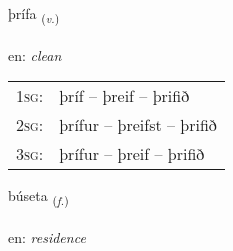 \documentclass[frontgrid, backgrid]{flacards}\usepackage[]{graphicx}\usepackage[]{xcolor}
\begin{document}
\renewcommand{\flhead}{\vskip5pt \fboxsep=0pt {\small\bfseries\footnotesize Sagnorð | Verb}}
\renewcommand{\fcfoot}{\vskip5pt \fboxsep=0pt \hspace{2pt}{\small\bfseries\footnotesize 3K}}

\renewcommand{\blhead}{\vskip5pt {\small\bfseries\footnotesize Sagnorð | Verb }}
\renewcommand{\bcfoot}{\vskip5pt \hspace{2pt}{\small\bfseries\footnotesize 3K}}


{þrífa \small{\textsubscript{(\textit{v.})}} \\[1ex] %
\textphonetic{[θriːva]} \\
en: \emph{clean} \\  [2ex]
\renewcommand*{\arraystretch}{0.8}
\begin{tabular}{p{1cm}l}
\textsc{1sg}: & þríf -- þreif -- þrifið \\ 
\textsc{2sg}: & þrífur -- þreifst -- þrifið \\ 
\textsc{3sg}: & þrífur -- þreif -- þrifið \\ 
\end{tabular}
}

\renewcommand{\flhead}{\vskip5pt \fboxsep=0pt {\small\bfseries\footnotesize Nafnorð | Noun}}
\renewcommand{\fcfoot}{\vskip5pt \fboxsep=0pt \hspace{2pt}{\small\bfseries\footnotesize 3K}}

\renewcommand{\blhead}{\vskip5pt {\small\bfseries\footnotesize Nafnorð | Noun }}
\renewcommand{\bcfoot}{\vskip5pt \hspace{2pt}{\small\bfseries\footnotesize 3K}}


{búseta \small{\textsubscript{(\textit{f.})}} \\[1ex] %
\textphonetic{[puːsɛta]} \\
en: \emph{residence} \\  [2ex]
\renewcommand*{\arraystretch}{0.8}
}
\end{document}
